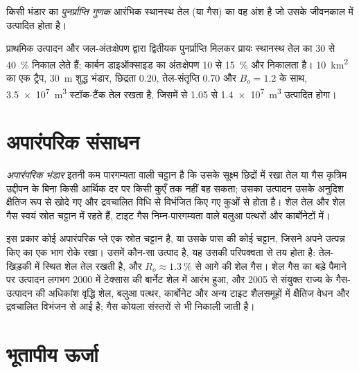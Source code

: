 \begin{definition}[पुनर्प्राप्ति गुणक]\label{def:b2:energy-geology:volumetrics}
किसी भंडार का \emph{पुनर्प्राप्ति गुणक} आरंभिक स्थानस्थ तेल (या गैस) का वह अंश है
जो उसके जीवनकाल में उत्पादित होता है।
\end{definition}

प्राथमिक उत्पादन और जल-अंतःक्षेपण द्वारा द्वितीयक पुनर्प्राप्ति मिलकर प्रायः स्थानस्थ तेल का 30 से \qty{40}{\percent} निकाल लेते हैं; कार्बन
डाइऑक्साइड का अंतःक्षेपण 10 से \qty{15}{\percent} और निकालता है। \qty{10}{km^2} का एक ट्रैप, \qty{30}{m} शुद्ध
भंडार, छिद्रता 0.20, तेल-संतृप्ति 0.70 और $B_o = 1.2$ के साथ, \qty{3.5e7}{m^3} स्टॉक-टैंक तेल रखता है,
जिसमें से 1.05 से \qty{1.4e7}{m^3} उत्पादित होगा।

\section{अपारंपरिक संसाधन}\label{sec:b2:energy-geology:unconventional}

\begin{definition}[अपारंपरिक भंडार]\label{def:b2:energy-geology:unconventional}
\emph{अपारंपरिक भंडार} इतनी कम पारगम्यता वाली चट्टान है कि उसके सूक्ष्म छिद्रों
में रखा तेल या गैस कृत्रिम उद्दीपन के बिना किसी आर्थिक दर पर किसी कुएँ तक नहीं बह सकता; उसका उत्पादन उसके
अनुदिश क्षैतिज रूप से खोदे गए और द्रवचालित विधि से विभंजित किए गए कुओं से होता है। शेल तेल और शेल गैस
स्वयं स्रोत चट्टान में रहते हैं, टाइट गैस निम्न-पारगम्यता वाले बलुआ पत्थरों और
कार्बोनेटों में।
\end{definition}

इस प्रकार कोई अपारंपरिक प्ले एक स्रोत चट्टान है, या उसके पास की कोई चट्टान, जिसने अपने उत्पन्न किए का एक भाग
रोके रखा। उसमें कौन-सा उत्पाद है, यह उसकी परिपक्वता से तय होता है: तेल-खिड़की में स्थित शेल तेल रखती है,
और $R_o \approx \qty{1.3}{\percent}$ से आगे की शेल गैस। शेल गैस का बड़े पैमाने पर उत्पादन लगभग
2000 में टेक्सास की बार्नेट शेल में आरंभ हुआ, और 2005 से संयुक्त राज्य के गैस-उत्पादन की अधिकांश वृद्धि
शेल, बलुआ पत्थर, कार्बोनेट और अन्य टाइट शैलसमूहों में क्षैतिज वेधन और द्रवचालित विभंजन से आई है;
गैस कोयला संस्तरों से भी निकाली जाती है।

\section{भूतापीय ऊर्जा}\label{sec:b2:energy-geology:geothermal}

